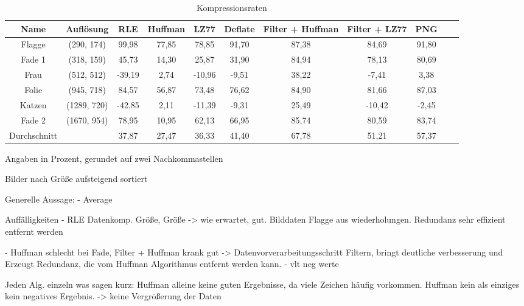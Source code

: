 \documentclass[conference]{IEEEtran}
\begin{document}
\begin{table}
  \renewcommand*{\arraystretch}{1.1}
  \centering
  \begin{threeparttable}
    \caption{Kompressionsraten}
    \begin{tabular}{c *9{c} S[table-format=5.9]}
      \toprule
      Name   & Auflösung   & RLE    & Huffman & LZ77   & Deflate & Filter + Huffman & Filter + LZ77 & PNG   \\
      \midrule
      Flagge & (290, 174)  & 99,98  & 77,85   & 78,85  & 91,70   & 87,38            & 84,69         & 91,80 \\
      Fade 1 & (318, 159)  & 45,73  & 14,30   & 25,87  & 31,90   & 84,94            & 78,13         & 80,69 \\
      Frau   & (512, 512)  & -39,19 & 2,74    & -10,96 & -9,51   & 38,22            & -7,41         & 3,38  \\
      Folie  & (945, 718)  & 84,57  & 56,87   & 73,48  & 76,62   & 84,90            & 81,66         & 87,03 \\
      Katzen & (1289, 720) & -42,85 & 2,11    & -11,39 & -9,31   & 25,49            & -10,42        & -2,45 \\
      Fade 2 & (1670, 954) & 78,95  & 10,95   & 62,13  & 66,95   & 85,74            & 80,59         & 83,74 \\
      \bottomrule
      Durchschnitt &       & 37,87  & 27,47   & 36,33  & 41,40   & 67,78            & 51,21         & 57,37 \\
    \end{tabular}
    \par{} Angaben in Prozent, gerundet auf zwei Nachkommastellen
    \par{} Bilder nach Größe aufsteigend sortiert
    \label{tab:komprate}
  \end{threeparttable}
\end{table}

Generelle Aussage:
- Average 

Auffälligkeiten
- RLE Datenkomp. Größe, Größe -> wie erwartet, gut. Bilddaten Flagge
aus wiederholungen. Redundanz sehr effizient entfernt werden

- Huffman schlecht bei Fade, Filter + Huffman krank gut -> Datenvorverarbeitungsschritt
Filtern, bringt deutliche verbesserung und Erzeugt Redundanz, die vom
Huffman Algorithmus entfernt werden kann.
- vlt neg werte


Jeden Alg. einzeln was sagen kurz:
Huffman alleine keine guten Ergebnisse, da viele Zeichen häufig vorkommen.
Huffman kein als einziges kein negatives Ergebnis. -> keine Vergrößerung der Daten
\end{document}
